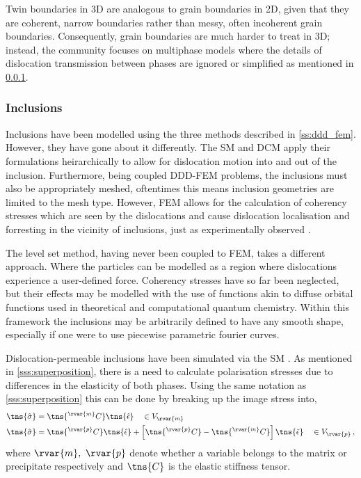 Twin boundaries in 3D are analogous to grain boundaries in 2D, given that they are coherent, narrow boundaries rather than messy, often incoherent grain boundaries. Consequently, grain boundaries are much harder to treat in 3D; instead, the community focuses on multiphase models where the details of dislocation transmission between phases are ignored or simplified as mentioned in \cref{sss:inclusions}.

\subsubsection{Inclusions}
\label{sss:inclusions}
Inclusions have been modelled using the three methods described in \cref{ss:ddd_fem}. However, they have gone about it differently. The SM and DCM apply their formulations heirarchically to allow for dislocation motion into and out of the inclusion. Furthermore, being coupled DDD-FEM problems, the inclusions must also be appropriately meshed, oftentimes this means inclusion geometries are limited to the mesh type. However, FEM allows for the calculation of coherency stresses which are seen by the dislocations and cause dislocation localisation and forresting in the vicinity of inclusions, just as experimentally observed \cite{sm_incl, dcm_incl}.

The level set method, having never been coupled to FEM, takes a different approach. Where the particles can be modelled as a region where dislocations experience a user-defined force. Coherency stresses have so far been neglected, but their effects may be modelled with the use of functions akin to diffuse orbital functions used in theoretical and computational quantum chemistry. Within this framework the inclusions may be arbitrarily defined to have any smooth shape, especially if one were to use piecewise parametric fourier curves.

Dislocation-permeable inclusions have been simulated via the SM \cite{sm_incl}. As mentioned in \cref{sss:superposition}, there is a need to calculate polarisation stresses due to differences in the elasticity of both phases. Using the same notation as \cref{sss:superposition} this can be done by breaking up the image stress into,
\begin{subequations}
    \begin{align}\label{eq:sm_pol_stress}
        \tns{\hat{\sigma}} & = \tns{^{\rvar{m}}C} \tns{\hat{\epsilon}} \quad \in V_{\rvar{m}}                                                                                  \\
        \tns{\hat{\sigma}} & = \tns{^{\rvar{p}}C} \tns{\hat{\epsilon}} + \left[\tns{^{\rvar{p}}C} - \tns{^{\rvar{m}}C}\right] \tns{\tilde{\epsilon}} \quad \in V_{\rvar{p}}\,,
    \end{align}
\end{subequations}
where $ \rvar{m},~\rvar{p} $ denote whether a variable belongs to the matrix or precipitate respectively and $ \tns{C} $ is the elastic stiffness tensor.

